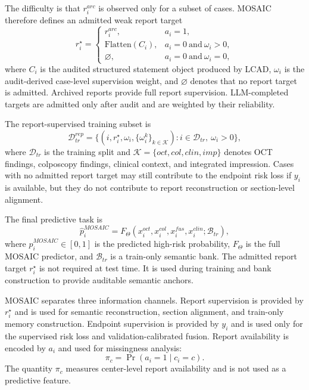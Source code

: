 The difficulty is that $r_i^{arc}$ is observed only for a subset of cases. MOSAIC therefore defines an admitted weak report target
\begin{equation}
r_i^{\star}
=
\begin{cases}
r_i^{arc}, & a_i=1,\\
\mathrm{Flatten}(C_i), & a_i=0\ \mathrm{and}\ \omega_i>0,\\
\varnothing, & a_i=0\ \mathrm{and}\ \omega_i=0,
\end{cases}
\label{eq:mosaic_report_target_final_topcs}
\end{equation}
where $C_i$ is the audited structured statement object produced by LCAD, $\omega_i$ is the audit-derived case-level supervision weight, and $\varnothing$ denotes that no report target is admitted. Archived reports provide full report supervision. LLM-completed targets are admitted only after audit and are weighted by their reliability.

The report-supervised training subset is
\begin{equation}
\mathcal{D}_{tr}^{rep}
=
\{(i,r_i^{\star},\omega_i,\{\omega_i^k\}_{k\in\mathcal{K}}):
i\in\mathcal{D}_{tr},\ \omega_i>0\},
\label{eq:mosaic_report_training_set_final_topcs}
\end{equation}
where $\mathcal{D}_{tr}$ is the training split and $\mathcal{K}=\{oct,col,clin,imp\}$ denotes OCT findings, colposcopy findings, clinical context, and integrated impression. Cases with no admitted report target may still contribute to the endpoint risk loss if $y_i$ is available, but they do not contribute to report reconstruction or section-level alignment.

The final predictive task is
\begin{equation}
\hat p_i^{MOSAIC}
=
F_{\Theta}(x_i^{oct},x_i^{col},x_i^{fus},x_i^{clin};\mathcal{B}_{tr}),
\label{eq:mosaic_prediction_task_final_topcs}
\end{equation}
where $\hat p_i^{MOSAIC}\in[0,1]$ is the predicted high-risk probability, $F_{\Theta}$ is the full MOSAIC predictor, and $\mathcal{B}_{tr}$ is a train-only semantic bank. The admitted report target $r_i^{\star}$ is not required at test time. It is used during training and bank construction to provide auditable semantic anchors.

MOSAIC separates three information channels. Report supervision is provided by $r_i^{\star}$ and is used for semantic reconstruction, section alignment, and train-only memory construction. Endpoint supervision is provided by $y_i$ and is used only for the supervised risk loss and validation-calibrated fusion. Report availability is encoded by $a_i$ and used for missingness analysis:
\begin{equation}
\pi_c=\Pr(a_i=1\mid c_i=c).
\label{eq:mosaic_center_report_rate_final_topcs}
\end{equation}
The quantity $\pi_c$ measures center-level report availability and is not used as a predictive feature.

